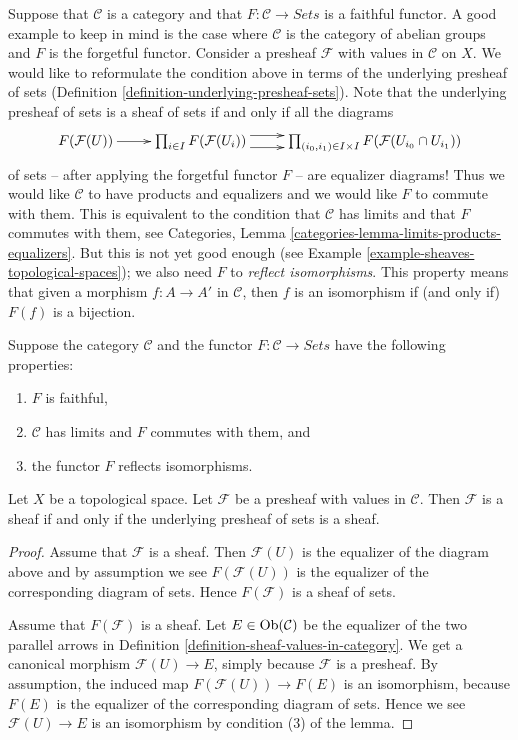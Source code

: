 \noindent
Suppose that $\mathcal{C}$ is a category and that
$F : \mathcal{C} \to \textit{Sets}$ is a faithful functor.
A good example to keep in mind is the case where $\mathcal{C}$
is the category of abelian groups and $F$ is the forgetful functor.
Consider a presheaf $\mathcal{F}$ with values in $\mathcal{C}$ on $X$.
We would like to reformulate the condition above in terms
of the underlying presheaf of sets
(Definition \ref{definition-underlying-presheaf-sets}).
Note that the underlying
presheaf of sets is a sheaf of sets if and only if all the
diagrams
$$
\xymatrix{
F(\mathcal{F}(U)) \ar[r]
&
\prod\nolimits_{i\in I}
F(\mathcal{F}(U_i))
\ar@<1ex>[r] \ar@<-1ex>[r]
&
\prod\nolimits_{(i_0, i_1) \in I \times I}
F(\mathcal{F}(U_{i_0} \cap U_{i_1}))
}
$$
of sets -- after applying the forgetful functor $F$ -- are
equalizer diagrams! Thus we would like $\mathcal{C}$ to have
products and equalizers and we would like $F$ to commute with
them. This is equivalent to the condition that $\mathcal{C}$
has limits and that $F$ commutes with them, see
Categories, Lemma \ref{categories-lemma-limits-products-equalizers}.
But this is not yet good enough
(see Example \ref{example-sheaves-topological-spaces});
we also need $F$ to {\it reflect isomorphisms}.
This property means that given a morphism
$f : A \to A'$ in $\mathcal{C}$, then $f$ is
an isomorphism if (and only if) $F(f)$ is a bijection.

\begin{lemma}
\label{lemma-sheaves-structure}
Suppose the category $\mathcal{C}$ and
the functor $F : \mathcal{C} \to \textit{Sets}$
have the following properties:
\begin{enumerate}
\item $F$ is faithful,
\item $\mathcal{C}$ has limits and $F$ commutes with them, and
\item the functor $F$ reflects isomorphisms.
\end{enumerate}
Let $X$ be a topological space. Let $\mathcal{F}$
be a presheaf with values in $\mathcal{C}$.
Then $\mathcal{F}$ is a sheaf if and only if the
underlying presheaf of sets is a sheaf.
\end{lemma}

\begin{proof}
Assume that $\mathcal{F}$ is a sheaf. Then
$\mathcal{F}(U)$ is the equalizer of the diagram
above and by assumption we see $F(\mathcal{F}(U))$
is the equalizer of the corresponding diagram
of sets. Hence $F(\mathcal{F})$ is a sheaf of sets.

\medskip\noindent
Assume that $F(\mathcal{F})$ is a sheaf.
Let $E \in \mathop{\mathrm{Ob}}\nolimits(\mathcal{C})$ be the
equalizer of the two parallel arrows in
Definition \ref{definition-sheaf-values-in-category}.
We get a canonical morphism $\mathcal{F}(U) \to E$,
simply because $\mathcal{F}$ is a presheaf.
By assumption, the induced map $F(\mathcal{F}(U)) \to F(E)$
is an isomorphism, because $F(E)$ is the equalizer
of the corresponding diagram of sets. Hence we
see $\mathcal{F}(U) \to E$ is an isomorphism
by condition (3) of the lemma.
\end{proof}

